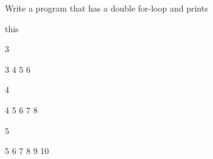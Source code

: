 Write a program that has a double for-loop and prints

this

\begin{console}

3

  3 4 5 6

4

  4 5 6 7 8

5

  5 6 7 8 9 10

\end{console}

